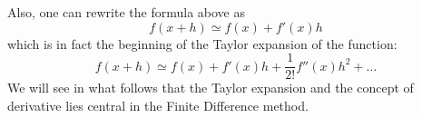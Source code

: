 \noindent Also, one can rewrite the formula above as
\[
f(x+h) \simeq f(x) +  f'(x) h
\]
which is in fact the beginning of the Taylor expansion of the function:
\[
f(x+h) \simeq f(x) +  f'(x) h + \frac{1}{2!} f''(x) h^2 + \dots 
\]
We will see in what follows that the Taylor expansion and the concept of derivative lies 
central in the Finite Difference method. 

